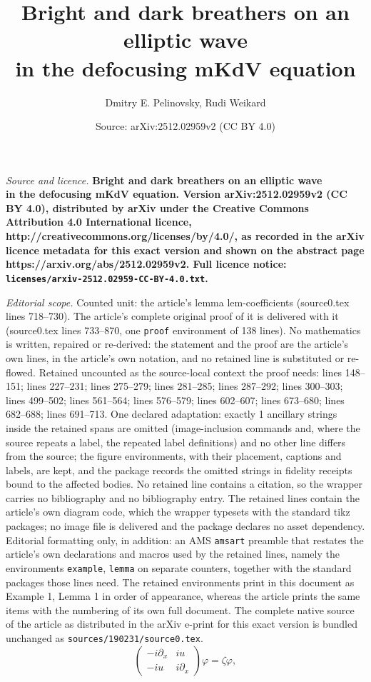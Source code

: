 \documentclass[10pt,a4paper]{amsart}
\title{\bf Bright and dark breathers on an elliptic wave \\in the defocusing mKdV equation}
\author{Dmitry E. Pelinovsky, Rudi Weikard}
\date{Source: arXiv:2512.02959v2 (CC BY 4.0)}
\begin{document}
\maketitle

\noindent\emph{Source and licence.} \bf Bright and dark breathers on an elliptic wave \\in the defocusing mKdV equation. Version arXiv:2512.02959v2 (CC BY 4.0), distributed by arXiv under the Creative Commons Attribution 4.0 International licence, http://creativecommons.org/licenses/by/4.0/, as recorded in the arXiv licence metadata for this exact version and shown on the abstract page https://arxiv.org/abs/2512.02959v2. Full licence notice: \texttt{licenses/arxiv-2512.02959-CC-BY-4.0.txt}.\par\smallskip

\noindent\textit{Editorial scope.} Counted unit: the article's lemma lem-coefficients (source0.tex lines 718--730). The article's complete original proof of it is delivered with it (source0.tex lines 733--870, one \texttt{proof} environment of 138 lines). No mathematics is written, repaired or re-derived: the statement and the proof are the article's own lines, in the article's own notation, and no retained line is substituted or re-flowed.  Retained uncounted as the source-local context the proof needs: lines 148--151; lines 227--231; lines 275--279; lines 281--285; lines 287--292; lines 300--303; lines 499--502; lines 561--564; lines 576--579; lines 602--607; lines 673--680; lines 682--688; lines 691--713.  One declared adaptation: exactly 1 ancillary strings inside the retained spans are omitted (image-inclusion commands and, where the source repeats a label, the repeated label definitions) and no other line differs from the source; the figure environments, with their placement, captions and labels, are kept, and the package records the omitted strings in fidelity receipts bound to the affected bodies.  No retained line contains a citation, so the wrapper carries no bibliography and no bibliography entry.  The retained lines contain the article's own diagram code, which the wrapper typesets with the standard tikz packages; no image file is delivered and the package declares no asset dependency.  Editorial formatting only, in addition: an AMS \texttt{amsart} preamble that restates the article's own declarations and macros used by the retained lines, namely the environments \texttt{example}, \texttt{lemma} on separate counters, together with the standard packages those lines need.  The retained environments print in this document as Example 1, Lemma 1 in order of appearance, whereas the article prints the same items with the numbering of its own full document.  The complete native source of the article as distributed in the arXiv e-print for this exact version is bundled unchanged as \texttt{sources/190231/source0.tex}.
\begin{equation}
\label{spectral-problem}
\left(\begin{array}{ll} -i \partial_x & i u\\ -i u & i \partial_x \end{array} \right) \varphi = \zeta \varphi,
\end{equation}
\end{document}
